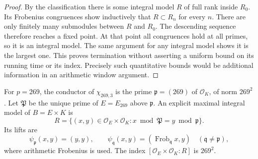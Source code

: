 \begin{proof}
By the classification there is some integral model $R$ of full
rank inside $R_0$. Its Frobenius congruences show inductively
that $R\subset R_n$ for every $n$. There are only finitely many
submodules between $R$ and $R_0$. The descending sequence
therefore reaches a fixed point. At that point all congruences
hold at all primes, so it is an integral model. The same argument
for any integral model shows it is the largest one. This proves
termination without asserting a uniform bound on its running
time or its index. Precisely such quantitative bounds would be
additional information in an arithmetic window argument.
\end{proof}

\begin{proposition}[AC-K04: the explicit host for $p=269$]
\label{AC-K04}
For $p=269$, the conductor of $\chi_{269,3}$ is the prime
$\mathfrak p=(269)$ of $\mathcal O_K$, of norm $269^2$.
Let $\mathfrak P$ be the unique prime of $E=E_{269}$ above
$\mathfrak p$. An explicit maximal integral model of
$B=E\times K$ is
\begin{equation}
 R=\{(x,y)\in\mathcal O_E\times\mathcal O_K:
                  x\bmod\mathfrak P=y\bmod\mathfrak p\}.
                                                               \label{eq:269-model}
\end{equation}
Its lifts are
\[
 \psi_{\mathfrak p}(x,y)=(y,y),\qquad
 \psi_{\mathfrak q}(x,y)=
       (\operatorname{Frob}_{\mathfrak q}x,y)
                     \quad(\mathfrak q\ne\mathfrak p),
\]
where arithmetic Frobenius is used. The index
$[\mathcal O_E\times\mathcal O_K:R]$ is $269^2$.
\end{proposition}

